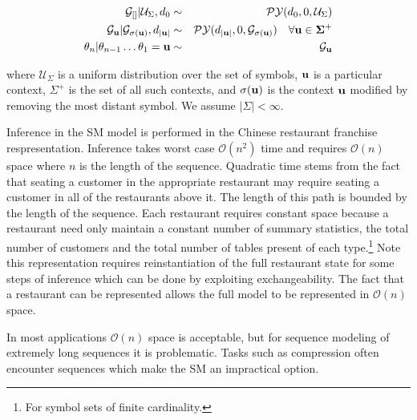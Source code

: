 \begin{eqnarray*}
	\G_{[]} | \mathcal{U}_{\Sigma}, d_0 &\sim& \PY(d_0, 0, \mathcal{U}_{\Sigma }) \\
	\G_{\bf{u}} | \G_{\sigma(\bf{u})}, d_{|\bf{u}|} &\sim& \PY(d_{|\bf{u}|}, 0, \G_{\sigma(\bf{u})}) \hspace{.35cm} \forall \bf{u} \in \Sigma^+\\
	\theta_n | \theta_{n-1}  \ldots \theta_1 = \bf{u} &\sim& \G_{\bf{u}}
\end{eqnarray*}

where $\mathcal{U}_{\Sigma }$ is a uniform distribution over the set of symbols, $\bf{u}$ is a particular context, $\Sigma^+$ is the set of all such contexts, and $\sigma(\bf{u})$ is the context $\bf{u}$ modified by removing the most distant symbol.  We assume $| \Sigma | < \infty$. 


Inference in the SM model is performed in the Chinese restaurant franchise respresentation. Inference takes worst case $\mathcal{O}(n^2)$ time and requires $\mathcal{O}(n)$ space where $n$ is the length of the sequence. Quadratic time stems from the fact that seating a customer in the appropriate restaurant may require seating a customer in all of the restaurants above it.  The length of this path is bounded by the length of the sequence. Each restaurant requires constant space because a restaurant need only maintain a constant number of summary statistics, the total number of customers and the total number of tables present of each type.\footnote{For symbol sets of finite cardinality.} Note this representation requires reinstantiation of the full restaurant state for some steps of inference which can be done by exploiting exchangeability.  The fact that a restaurant can be represented allows the full model to be represented in $\mathcal{O}(n)$ space.

In most applications $\mathcal{O}(n)$ space is acceptable, but for sequence modeling of extremely long sequences it is problematic.  Tasks such as compression often encounter sequences which make the SM an impractical option.  